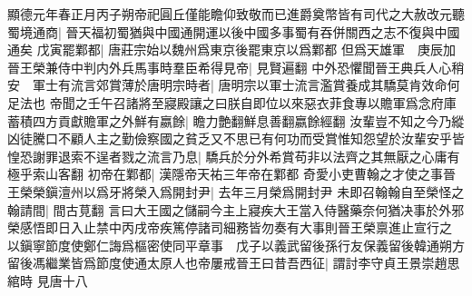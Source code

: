 顯德元年春正月丙子朔帝祀圓丘僅能瞻仰致敬而已進爵奠幣皆有司代之大赦改元聽蜀境通商|{
	晉天福初蜀猶與中國通開運以後中國多事蜀有吞併關西之志不復與中國通矣}
戊寅罷鄴都|{
	唐莊宗始以魏州爲東京後罷東京以爲鄴都}
但爲天雄軍　庚辰加晉王榮兼侍中判内外兵馬事時羣臣希得見帝|{
	見賢遍翻}
中外恐懼聞晉王典兵人心稍安　軍士有流言郊賞薄於唐明宗時者|{
	唐明宗以軍士流言濫賞養成其驕莫肯效命何足法也}
帝聞之壬午召諸將至寢殿讓之曰朕自即位以來惡衣菲食專以贍軍爲念府庫蓄積四方貢獻贍軍之外鮮有嬴餘|{
	瞻力艶翻鮮息善翻嬴餘經翻}
汝輩豈不知之今乃縱凶徒騰口不顧人主之勤儉察國之貧乏又不思已有何功而受賞惟知怨望於汝輩安乎皆惶恐謝罪退索不逞者戮之流言乃息|{
	驕兵於分外希賞苟非以法齊之其無厭之心庸有極乎索山客翻}
初帝在鄴都|{
	漢隱帝天祐三年帝在鄴都}
奇愛小吏曹翰之才使之事晉王榮榮鎭澶州以爲牙將榮入爲開封尹|{
	去年三月榮爲開封尹}
未即召翰翰自至榮怪之翰請間|{
	間古莧翻}
言曰大王國之儲嗣今主上寢疾大王當入侍醫藥奈何猶决事於外邪榮感悟即日入止禁中丙戌帝疾篤停諸司細務皆勿奏有大事則晉王榮禀進止宣行之　以鎭寧節度使鄭仁誨爲樞密使同平章事　戊子以義武留後孫行友保義留後韓通朔方留後馮繼業皆爲節度使通太原人也帝屢戒晉王曰昔吾西征|{
	謂討李守貞王景崇趙思綰時}
見唐十八

